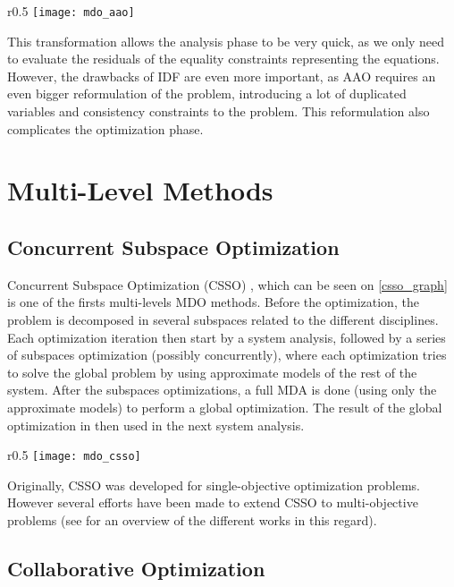 \begin{wrapfigure}{r}{0.5\textwidth}
\centering
\texttt{[image: mdo\_aao]}
\caption{AAO method}\label{aao_graph}
\end{wrapfigure}

This transformation allows the analysis phase to be very quick, as we only need to evaluate the residuals of the equality constraints representing the equations.
However, the drawbacks of IDF are even more important, as AAO requires an even bigger reformulation of the problem, introducing a lot of duplicated variables and consistency constraints to the problem. This reformulation also complicates the optimization phase.

\section{Multi-Level Methods}

\subsection{Concurrent Subspace Optimization}

Concurrent Subspace Optimization (CSSO) \cite{wujek1997concurrent}, which can be seen on \figurename{} \ref{csso_graph} is one of the firsts multi-levels MDO methods. Before the optimization, the problem is decomposed in several subspaces related to the different disciplines. Each optimization iteration then start by a system analysis, followed by a series of subspaces optimization (possibly concurrently), where each optimization tries to solve the global problem by using approximate models of the rest of the system. After the subspaces optimizations, a full MDA is done (using only the approximate models) to perform a global optimization. The result of the global optimization in then used in the next system analysis.

\begin{wrapfigure}{r}{0.5\textwidth}
\centering
\texttt{[image: mdo\_csso]}
\caption{CSSO method}\label{csso_graph}
\end{wrapfigure}

Originally, CSSO was developed for single-objective optimization problems. However several efforts have been made to extend CSSO to multi-objective problems (see \cite{zhang2011} for an overview of the different works in this regard).

\subsection{Collaborative Optimization}

